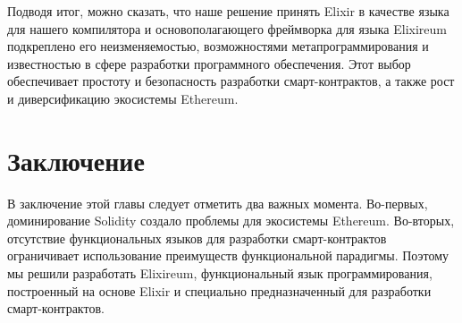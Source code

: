 Подводя итог, можно сказать, что наше решение принять Elixir в качестве языка для нашего компилятора и основополагающего фреймворка для языка Elixireum подкреплено его неизменяемостью, возможностями метапрограммирования и известностью в сфере разработки программного обеспечения. Этот выбор обеспечивает простоту и безопасность разработки смарт-контрактов, а также рост и диверсификацию экосистемы Ethereum.


\section{Заключение}
\label{sec:conc}

В заключение этой главы следует отметить два важных момента. Во-первых, доминирование Solidity создало проблемы для экосистемы Ethereum. Во-вторых, отсутствие функциональных языков для разработки смарт-контрактов ограничивает использование преимуществ функциональной парадигмы. Поэтому мы решили разработать Elixireum, функциональный язык программирования, построенный на основе Elixir и специально предназначенный для разработки смарт-контрактов.